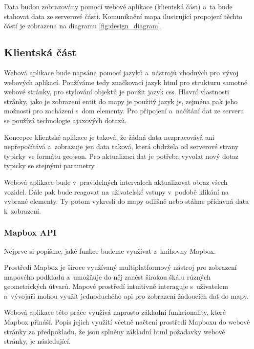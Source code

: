 Data budou zobrazovány pomocí webové aplikace (klientská část) a~ta bude stahovat data ze serverové části. Komunikační mapa ilustrující propojení těchto částí je zobrazena na diagramu \ref{fig:design_diagram}.


\subsection{Klientská část}


Webová aplikace bude napsána pomocí jazyků a~nástrojů vhodných pro vývoj webových aplikací. Používáme tedy značkovací jazyk \gls{html} pro strukturu samotné webové stránky, pro stylování objektů je použit jazyk \gls{css}. Hlavní vlastnosti stránky, jako je zobrazení entit do mapy je použitý jazyk \gls{js}, zejména pak jeho možností pro zacházení s~\gls{dom} elementy. Pro připojení a~načítání dat ze serveru se používá technologie \gls{ajax}ových dotazů.


\bigbreak


Koncepce klientské aplikace je taková, že žádná data nezpracovává ani nepřepočítává a~zobrazuje jen data taková, která obdržela od serverové strany typicky ve formátu \gls{geojson}. Pro aktualizaci dat je potřeba vyvolat nový dotaz typicky se stejnými parametry.


\bigbreak


Webová aplikace bude v~pravidelných intervalech aktualizovat obraz všech vozidel. Dále pak bude reagovat na uživatelské vstupy v~podobě klikání na vybrané elementy. Ty potom vykreslí do mapy odlišně nebo stáhne přídavná data k~zobrazení.


\subsubsection{Mapbox API}


Nejprve si popišme, jaké funkce budeme využívat z~knihovny Mapbox.


\bigbreak


Prostředí Mapbox je široce využívaný multiplatformový nástroj pro zobrazení mapového podkladu a~umožňuje do něj zanést širokou škálu různých geometrických útvarů. Mapové prostředí intuitivně interaguje s~uživatelem a~vývojáři mohou využít jednoduchého \gls{api} pro zobrazení žádoucích dat do mapy.


\bigbreak


Webová aplikace této práce využívá naprosto základní funkcionality, které Mapbox přináší. Popis jejich využití včetně načtení prostředí Mapboxu do webové stránky za předpokladu, že jsou splněny základní \gls{html} požadavky webové stránky, je následující.


